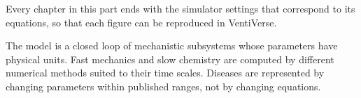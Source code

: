 \begin{simnote}
Every chapter in this part ends with the simulator settings that correspond to its equations, so that each figure can be reproduced in VentiVerse.
\end{simnote}

\begin{summarybox}
The model is a closed loop of mechanistic subsystems whose parameters have physical units. Fast mechanics and slow chemistry are computed by different numerical methods suited to their time scales. Diseases are represented by changing parameters within published ranges, not by changing equations.
\end{summarybox}
